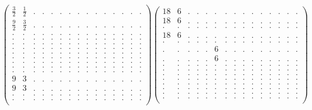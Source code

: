 \documentclass[12pt,a4paper]{amsart}
\begin{document}
\begin{align*}
\left(\begin{array}{rrrrrrrrrrrrrrr}%
\frac32&\frac12&.&.&.&.&.&.&.&.&.&.&.&.&.\\%
\frac{9}{2}&\frac32&.&.&.&.&.&.&.&.&.&.&.&.&.\\%
.&.&.&.&.&.&.&.&.&.&.&.&.&.&.\\%
.&.&.&.&.&.&.&.&.&.&.&.&.&.&.\\%
.&.&.&.&.&.&.&.&.&.&.&.&.&.&.\\%
.&.&.&.&.&.&.&.&.&.&.&.&.&.&.\\%
.&.&.&.&.&.&.&.&.&.&.&.&.&.&.\\%
.&.&.&.&.&.&.&.&.&.&.&.&.&.&.\\%
.&.&.&.&.&.&.&.&.&.&.&.&.&.&.\\%
.&.&.&.&.&.&.&.&.&.&.&.&.&.&.\\%
.&.&.&.&.&.&.&.&.&.&.&.&.&.&.\\%
9&3&.&.&.&.&.&.&.&.&.&.&.&.&.\\%
9&3&.&.&.&.&.&.&.&.&.&.&.&.&.\\%
.&.&.&.&.&.&.&.&.&.&.&.&.&.&.\\%
.&.&.&.&.&.&.&.&.&.&.&.&.&.&.\\%
\end{array}\right)%
\left(\begin{array}{rrrrrrrrrrrrrrr}%
18&6&.&.&.&.&.&.&.&.&.&.&.&.&.\\%
18&6&.&.&.&.&.&.&.&.&.&.&.&.&.\\%
.&.&.&.&.&.&.&.&.&.&.&.&.&.&.\\%
18&6&.&.&.&.&.&.&.&.&.&.&.&.&.\\%
.&.&.&.&.&.&.&.&.&.&.&.&.&.&.\\%
.&.&.&.&.&6&.&.&.&.&.&.&.&.&.\\%
.&.&.&.&.&6&.&.&.&.&.&.&.&.&.\\%
.&.&.&.&.&.&.&.&.&.&.&.&.&.&.\\%
.&.&.&.&.&.&.&.&.&.&.&.&.&.&.\\%
.&.&.&.&.&.&.&.&.&.&.&.&.&.&.\\%
.&.&.&.&.&.&.&.&.&.&.&.&.&.&.\\%
.&.&.&.&.&.&.&.&.&.&.&.&.&.&.\\%
.&.&.&.&.&.&.&.&.&.&.&.&.&.&.\\%
.&.&.&.&.&.&.&.&.&.&.&.&.&.&.\\%
.&.&.&.&.&.&.&.&.&.&.&.&.&.&.\\%
\end{array}\right)%
\end{align*}
\end{document}
